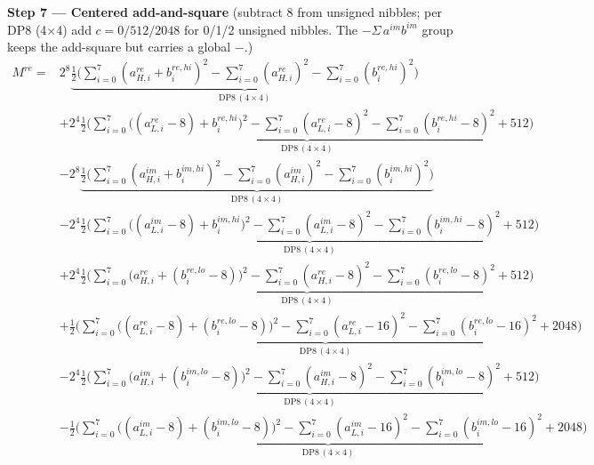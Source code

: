 \documentclass[fleqn]{article}
\newcommand{\DPop}[3]{\mathrm{DP#1}\,(#2\!\times\!#3)}
\begin{document}
\textbf{Step 7 --- Centered add-and-square}\quad
{\small(subtract $8$ from unsigned nibbles; per DP8 (4$\times$4) add $c=0/512/2048$ for 0/1/2 unsigned nibbles. The $-\Sigma\,a^{im}b^{im}$ group keeps the add-square but carries a global $-$.)}
\begin{align*}
M^{re} = {}
  & 2^{8}\underbrace{\tfrac12\Big(\sum_{i=0}^{7}(a_{H,i}^{re}{+}b_i^{re,hi})^2 - \sum_{i=0}^{7}(a_{H,i}^{re})^2 - \sum_{i=0}^{7}(b_i^{re,hi})^2\Big)}_{\DPop{8}{4}{4}} \\[0.4em]
  & + 2^{4}\underbrace{\tfrac12\Big(\sum_{i=0}^{7}\big((a_{L,i}^{re}{-}8){+}b_i^{re,hi}\big)^2 - \sum_{i=0}^{7}(a_{L,i}^{re}{-}8)^2 - \sum_{i=0}^{7}(b_i^{re,hi}{-}8)^2 + 512\Big)}_{\DPop{8}{4}{4}} \\[0.4em]
  & - 2^{8}\underbrace{\tfrac12\Big(\sum_{i=0}^{7}(a_{H,i}^{im}{+}b_i^{im,hi})^2 - \sum_{i=0}^{7}(a_{H,i}^{im})^2 - \sum_{i=0}^{7}(b_i^{im,hi})^2\Big)}_{\DPop{8}{4}{4}} \\[0.4em]
  & - 2^{4}\underbrace{\tfrac12\Big(\sum_{i=0}^{7}\big((a_{L,i}^{im}{-}8){+}b_i^{im,hi}\big)^2 - \sum_{i=0}^{7}(a_{L,i}^{im}{-}8)^2 - \sum_{i=0}^{7}(b_i^{im,hi}{-}8)^2 + 512\Big)}_{\DPop{8}{4}{4}} \\[0.4em]
  & + 2^{4}\underbrace{\tfrac12\Big(\sum_{i=0}^{7}\big(a_{H,i}^{re}{+}(b_i^{re,lo}{-}8)\big)^2 - \sum_{i=0}^{7}(a_{H,i}^{re}{-}8)^2 - \sum_{i=0}^{7}(b_i^{re,lo}{-}8)^2 + 512\Big)}_{\DPop{8}{4}{4}} \\[0.4em]
  & + \underbrace{\tfrac12\Big(\sum_{i=0}^{7}\big((a_{L,i}^{re}{-}8){+}(b_i^{re,lo}{-}8)\big)^2 - \sum_{i=0}^{7}(a_{L,i}^{re}{-}16)^2 - \sum_{i=0}^{7}(b_i^{re,lo}{-}16)^2 + 2048\Big)}_{\DPop{8}{4}{4}} \\[0.4em]
  & - 2^{4}\underbrace{\tfrac12\Big(\sum_{i=0}^{7}\big(a_{H,i}^{im}{+}(b_i^{im,lo}{-}8)\big)^2 - \sum_{i=0}^{7}(a_{H,i}^{im}{-}8)^2 - \sum_{i=0}^{7}(b_i^{im,lo}{-}8)^2 + 512\Big)}_{\DPop{8}{4}{4}} \\[0.4em]
  & - \underbrace{\tfrac12\Big(\sum_{i=0}^{7}\big((a_{L,i}^{im}{-}8){+}(b_i^{im,lo}{-}8)\big)^2 - \sum_{i=0}^{7}(a_{L,i}^{im}{-}16)^2 - \sum_{i=0}^{7}(b_i^{im,lo}{-}16)^2 + 2048\Big)}_{\DPop{8}{4}{4}}
\end{align*}
\end{document}
